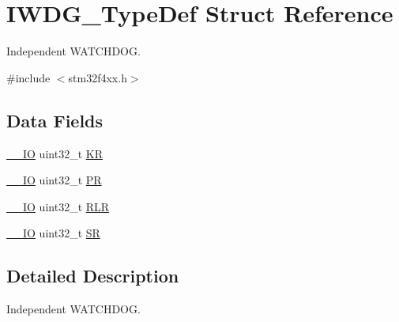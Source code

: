 \hypertarget{struct_i_w_d_g___type_def}{\section{I\-W\-D\-G\-\_\-\-Type\-Def Struct Reference}
\label{struct_i_w_d_g___type_def}
}


Independent W\-A\-T\-C\-H\-D\-O\-G.  




{\ttfamily \#include $<$stm32f4xx.\-h$>$}

\subsection*{Data Fields}
\begin{DoxyCompactItemize}
\item 
\hyperlink{group___c_m_s_i_s__core__definitions_gaec43007d9998a0a0e01faede4133d6be}{\-\_\-\-\_\-\-I\-O} uint32\-\_\-t \hyperlink{struct_i_w_d_g___type_def_a2f692354bde770f2a5e3e1b294ec064b}{K\-R}
\item 
\hyperlink{group___c_m_s_i_s__core__definitions_gaec43007d9998a0a0e01faede4133d6be}{\-\_\-\-\_\-\-I\-O} uint32\-\_\-t \hyperlink{struct_i_w_d_g___type_def_af8d25514079514d38c104402f46470af}{P\-R}
\item 
\hyperlink{group___c_m_s_i_s__core__definitions_gaec43007d9998a0a0e01faede4133d6be}{\-\_\-\-\_\-\-I\-O} uint32\-\_\-t \hyperlink{struct_i_w_d_g___type_def_a7015e1046dbd3ea8783b33dc11a69e52}{R\-L\-R}
\item 
\hyperlink{group___c_m_s_i_s__core__definitions_gaec43007d9998a0a0e01faede4133d6be}{\-\_\-\-\_\-\-I\-O} uint32\-\_\-t \hyperlink{struct_i_w_d_g___type_def_af6aca2bbd40c0fb6df7c3aebe224a360}{S\-R}
\end{DoxyCompactItemize}


\subsection{Detailed Description}
Independent W\-A\-T\-C\-H\-D\-O\-G. 

